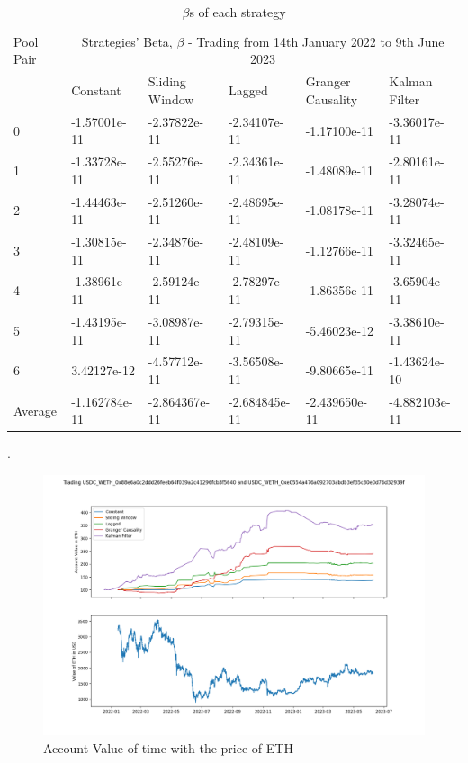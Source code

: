 \begin{table}[!htb]
    \centering
    \begin{adjustwidth}{-0.8in}{-0.9in}
        \begin{tabular}{|p{5em}|p{7em}|p{7em}|p{7em}|p{8em}|p{7em}|}\hline
            Pool Pair & \multicolumn{5}{|c|}{Strategies' Beta, $\beta$ - Trading from 14th January 2022 to 9th June 2023} \\\cline{1-6}
            & Constant & Sliding Window & Lagged & Granger Causality & Kalman Filter\\\cline{2-6}
            0 & -1.57001e-11 & -2.37822e-11 & -2.34107e-11 & -1.17100e-11 & -3.36017e-11\\\cline{2-6}
            1 & -1.33728e-11 & -2.55276e-11 & -2.34361e-11 & -1.48089e-11 & -2.80161e-11\\\cline{2-6}
            2 & -1.44463e-11 & -2.51260e-11 & -2.48695e-11 & -1.08178e-11 & -3.28074e-11\\\cline{2-6}
            3 & -1.30815e-11 & -2.34876e-11 & -2.48109e-11 & -1.12766e-11 & -3.32465e-11\\\cline{2-6}
            4 & -1.38961e-11 & -2.59124e-11 & -2.78297e-11 & -1.86356e-11 & -3.65904e-11\\\cline{2-6}
            5 & -1.43195e-11 & -3.08987e-11 & -2.79315e-11 & -5.46023e-12 & -3.38610e-11\\\cline{2-6}
            6 & 3.42127e-12 & -4.57712e-11 & -3.56508e-11 & -9.80665e-11 & -1.43624e-10\\\hline\hline
            Average & -1.162784e-11 & -2.864367e-11 & -2.684845e-11 & -2.439650e-11 & -4.882103e-11\\\hline
        \end{tabular}
    \end{adjustwidth}
    \caption{$\beta$s of each strategy \label{tab:betas}}.
\end{table}

\begin{figure}[H]
    \centering
    \includegraphics[width=\linewidth]{evaluation/Images/beta_visualisation.png}
    \caption{Account Value of time with the price of ETH}
    \label{fig:beta-vis}
\end{figure}

